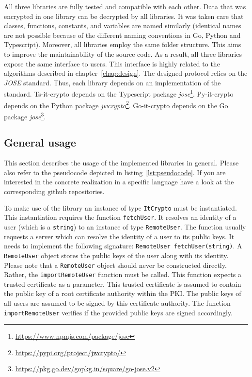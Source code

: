 \documentclass[../main.tex]{subfiles}
\begin{document}
All three libraries are fully tested and compatible with each other.
Data that was encrypted in one library can be decrypted by all libraries.
It was taken care that classes, functions, constants, and variables are named similarly (identical names are not possible because of the different naming conventions in Go, Python and Typescript).
Moreover, all libraries employ the same folder structure.
This aims to improve the maintainability of the source code.
As a result, all three libraries expose the same interface to users.
This interface is highly related to the algorithms described in chapter~\ref{chap:design}.
The designed protocol relies on the \emph{JOSE} standard.
Thus, each library depends on an implementation of the standard.
Ts-it-crypto depends on the Typescript package \emph{jose}\footnote{\url{https://www.npmjs.com/package/jose}}.
Py-it-crypto depends on the Python package \emph{jwcrypto}\footnote{\url{https://pypi.org/project/jwcrypto/}}.
Go-it-crypto depends on the Go package \emph{jose}\footnote{\url{https://pkg.go.dev/gopkg.in/square/go-jose.v2}}.

\subsection{General usage}

This section describes the usage of the implemented libraries in general.
Please also refer to the pseudocode depicted in listing~\ref{lst:pseudocode}.
If you are interested in the concrete realization in a specific language have a look at the corresponding github repositories.

To make use of the library an instance of type \verb|ItCrypto| must be instantiated.
This instantiation requires the function \verb|fetchUser|.
It resolves an identity of a user (which is a \verb|string|) to an instance of type \verb|RemoteUser|.
The function usually requests a server which can resolve the identity of a user to its public keys.
It needs to implement the following signature: \verb|RemoteUser fetchUser(string)|.
A \verb|RemoteUser| object stores the public keys of the user along with its identity.
Please note that a \verb|RemoteUser| object should never be constructed directly.
Rather, the \verb|importRemoteUser| function must be called.
This function expects a trusted certificate as a parameter.
This trusted certificate is assumed to contain the public key of a root certificate authority within the PKI.
The public keys of all users are assumed to be signed by this certificate authority.
The function \verb|importRemoteUser| verifies if the provided public keys are signed accordingly.
\end{document}
